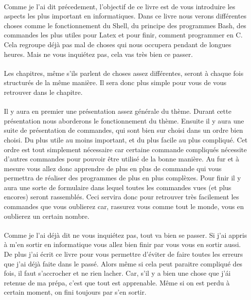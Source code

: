 \documentclass{article}
\begin{document}
\paragraph{}                      
Comme je l'ai dit pr\'ecedement, l'objectif de ce livre est de vous introduire les aspects les plus important en informatiques. Dans ce livre nous verons diff\'erentes choses comme le fonctionnement du Shell, du principe des programmes Bash, des commandes les plus utiles pour Latex et pour finir, comment programmer en C. Cela regroupe d\'ej\`a pas mal de choses qui nous occupera pendant de longues heures. Mais ne vous inqui\'etez pas, cela vas tr\`es bien ce passer.

\paragraph{}
Les chapitres, m\^eme s'ils parlent de choses assez diff\'erentes, seront \`a chaque fois structur\'es de la m\^eme mani\`ere. Il sera donc plus simple pour vous de vous retrouver dans le chapitre. 


\paragraph{}
Il y aura en premier une pr\'esentation assez g\'en\'erale du th\`eme. Durant cette pr\'esentation nous aborderons le fonctionnement du th\`eme. Ensuite il y aura une suite de pr\'esentation de commandes, qui sont bien sur choisi dans un ordre bien choisi. Du plus utile au moins important, et du plus facile au plus compliqu\'e. Cet ordre est tout simplement n\'ecessaire car certaine commande compliqu\'es n\'ecessite d'autres commandes pour pouvoir \^etre utilis\'e de la bonne mani\`ere. Au fur et \`a mesure vous allez donc apprendre de plus en plus de commande qui vous permettra de r\'ealiser des programmes de plus en plus compl\`exes. Pour finir il y aura une sorte de formulaire dans lequel toutes les commandes vues (et plus encores) seront rassembl\'es. Ceci servira donc pour retrouver tr\`es facilement les commandes que vous oublierez car, rassurez vous comme tout le monde, vous en oublierez un certain nombre. 

\paragraph{}
Comme je l'ai d\'ej\`a dit ne vous inqui\'etez pas, tout va bien se passer. Si j'ai appris \`a m'en sortir en informatique vous allez bien finir par vous vous en sortir aussi. De plus j'ai \'ecrit ce livre pour vous permettre d'\'eviter de faire toutes les erreurs que j'ai d\'ej\`a faite dans le pass\'e. Alors m\^eme si cela peut paraitre compliqu\'e des fois, il faut s'accrocher et ne rien lacher. Car, s'il y a bien une chose que j'\'ai retenue de ma pr\'epa, c'est que tout est apprenable. M\^eme si on est perdu \`a certain moment, on fini toujours par s'en sortir. 
\end{document}
